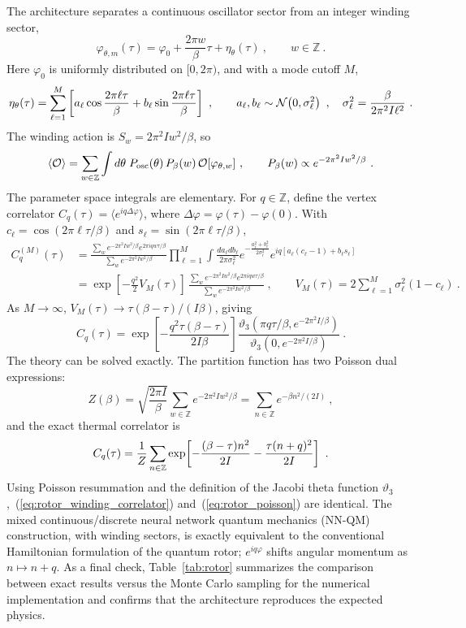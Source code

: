\documentclass[11pt,a4paper]{article}
\newcommand\be{\begin{equation}}
\newcommand\ee{\end{equation}}
\newcommand\eref[1]{(\ref{#1})}
\begin{document}
The architecture separates a continuous oscillator sector from an integer winding sector,
\be
\varphi_{\theta,m}(\tau)=\varphi_0+\frac{2\pi w}{\beta}\tau+\eta_{\theta}(\tau)~,\qquad
w\in\mathbb Z~.
\label{eq:rotor_architecture}
\ee
Here $\varphi_0$ is uniformly distributed on $[0, 2 \pi)$, and with a mode cutoff $M$,
\be
\eta_{\theta}(\tau)=\sum_{\ell=1}^{M}\left[a_\ell\cos\frac{2\pi\ell\tau}{\beta}+b_\ell\sin\frac{2\pi\ell\tau}{\beta}\right]~,\qquad
a_\ell,b_\ell\sim {\cal N}\!\left(0,\sigma_\ell^2\right)~,\quad
\sigma_\ell^2=\frac{\beta}{2\pi^2 I\ell^2}~.
\label{eq:rotor_modes}
\ee
The winding action is $S_w=2\pi^2 I w^2/\beta$, so
\be
\langle{\cal O}\rangle=\sum_{w\in\mathbb Z}\int d\theta\;P_\text{osc}(\theta)\, P_\beta(w)\,{\cal O}[\varphi_{\theta,w}]~,
\qquad
P_\beta(w)\propto e^{-2\pi^2 I w^2/\beta}~.
\label{eq:rotor_mixed}
\ee
%
The parameter space integrals are elementary. For $q\in\mathbb Z$, define the vertex correlator $C_q(\tau)=\langle e^{iq\Delta\varphi}\rangle$, where $\Delta\varphi=\varphi(\tau)-\varphi(0)$. With $c_\ell=\cos(2\pi\ell\tau/\beta)$ and $s_\ell=\sin(2\pi\ell\tau/\beta)$,
\be
\begin{aligned}
C_q^{(M)}(\tau)
&= \frac{\sum_w e^{-2\pi^2 I w^2/\beta}e^{2\pi iqw\tau/\beta}}{\sum_w e^{-2\pi^2 I w^2/\beta}} \prod_{\ell=1}^{M} \int\frac{da_\ell db_\ell}{2\pi\sigma_\ell^2} e^{-\frac{a_\ell^2+b_\ell^2}{2\sigma_\ell^2}} e^{iq[a_\ell(c_\ell-1)+b_\ell s_\ell]} \\
&= \exp\!\left[-\frac{q^2}{2}V_M(\tau)\right]\, \frac{\sum_w e^{-2\pi^2 I w^2/\beta}e^{2\pi iqw\tau/\beta}} {\sum_w e^{-2\pi^2 I w^2/\beta}}~,\qquad
V_M(\tau)=2\sum_{\ell=1}^M\sigma_\ell^2(1-c_\ell)~.
\end{aligned}
\label{eq:rotor_integral}
\ee
As $M\to\infty$, $V_M(\tau)\to \tau(\beta-\tau)/(I\beta)$, giving
\be
C_q(\tau) = \exp\!\left[-\frac{q^2\tau(\beta-\tau)}{2I\beta}\right] \frac{\vartheta_3\!\left(\pi q\tau/\beta,e^{-2\pi^2 I/\beta}\right)} {\vartheta_3\!\left(0,e^{-2\pi^2 I/\beta}\right)}~.
\label{eq:rotor_winding_correlator}
\ee
%
The theory can be solved exactly.
The partition function has two Poisson dual expressions:
\be
Z(\beta) = \sqrt{\frac{2\pi I}{\beta}}\sum_{w\in\mathbb Z}e^{-2\pi^2 I w^2/\beta} =\sum_{n\in\mathbb Z}e^{-\beta n^2/(2I)}~,
\ee
and the exact thermal correlator is
\be
C_q(\tau) = {1\over Z}\sum_{n\in\mathbb Z} \exp\!\left[-{(\beta-\tau)n^2\over 2I}-{\tau(n+q)^2\over 2I}\right]~.\\
\label{eq:rotor_poisson}
\ee
Using Poisson resummation and the definition of the Jacobi theta function $\vartheta_3$,~\eref{eq:rotor_winding_correlator} and~\eref{eq:rotor_poisson} are identical. The mixed continuous/discrete neural network quantum mechanics (NN-QM) construction, with winding sectors, is exactly equivalent to the conventional Hamiltonian formulation of the quantum rotor; $e^{iq\varphi}$ shifts angular momentum as $n\mapsto n+q$. As a final check, Table~\ref{tab:rotor} summarizes the comparison between exact results versus the Monte Carlo sampling for the numerical implementation and confirms that the architecture reproduces the expected physics.
\end{document}
